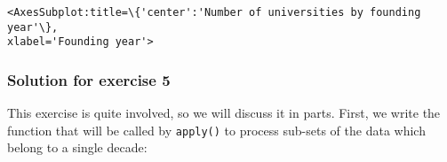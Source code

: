 \documentclass{scrartcl}
\makeatletter
\newcommand{\boxspacing}{\kern\kvtcb@left@rule\kern\kvtcb@boxsep}
\newcommand{\prompt}[4]{
        {\ttfamily\llap{{\color{#2}[#3]:\hspace{3pt}#4}}\vspace{-\baselineskip}}
    }
\makeatother
\begin{document}
            \begin{tcolorbox}[breakable, size=fbox, boxrule=.5pt, pad at break*=1mm, opacityfill=0]
\prompt{Out}{outcolor}{50}{\boxspacing}
\begin{Verbatim}[commandchars=\\\{\}]
<AxesSubplot:title=\{'center':'Number of universities by founding year'\},
xlabel='Founding year'>
\end{Verbatim}
\end{tcolorbox}
        
    \begin{center}
    \end{center}
    
    \hypertarget{solution-for-exercise-5}{%
\subsubsection{Solution for exercise 5}\label{solution-for-exercise-5}}

This exercise is quite involved, so we will discuss it in parts. First,
we write the function that will be called by \texttt{apply()} to process
sub-sets of the data which belong to a single decade:
\end{document}
